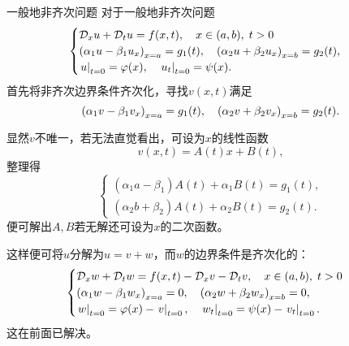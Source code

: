 \begin{method}{一般地非齐次问题}{}
	对于一般地非齐次问题
	\begin{align*}
		\begin{cases}
			\mathcal D_xu+\mathcal D_tu=f(x,t),\quad x\in(a,b),\;t>0\\
			\left(\alpha_1u-\beta_1u_x\right)_{x=a}=g_1(t),\quad\left(\alpha_2u+\beta_2u_x\right)_{x=b}=g_2(t),\\
			\left.u\right\rvert_{t=0}=\varphi(x),\quad\left.u_t\right\rvert_{t=0}=\psi(x).
		\end{cases}
	\end{align*}
	首先将非齐次边界条件齐次化，寻找$v(x,t)$满足 
	\[
		\left(\alpha_1v-\beta_1v_x\right)_{x=a}=g_1(t),\quad\left(\alpha_2v+\beta_2v_x\right)_{x=b}=g_2(t).
	\]
	
	显然$v$不唯一，若无法直觉看出，可设为$x$的线性函数
	\[
		v(x,t)=A(t)x+B(t),
	\]
	整理得
	\[
		\begin{cases}
			(\alpha_1a-\beta_1)A(t)+\alpha_1B(t)=g_1(t),\\
			(\alpha_2b+\beta_2)A(t)+\alpha_2B(t)=g_2(t).
		\end{cases}
	\]
	便可解出$A,B$若无解还可设为$x$的二次函数。
	
	这样便可将$u$分解为$u=v+w$，而$w$的边界条件是齐次化的：
	\begin{align*}
		\begin{cases}
			\mathcal D_xw+\mathcal D_tw=f(x,t)-\mathcal D_xv-\mathcal D_tv,\quad x\in(a,b),\;t>0\\
			\left(\alpha_1w-\beta_1w_x\right)_{x=a}=0,\quad\left(\alpha_2w+\beta_2w_x\right)_{x=b}=0,\\
			\left.w\right\rvert_{t=0}=\varphi(x)-\left.v\right\rvert_{t=0},\quad\left.w_t\right\rvert_{t=0}=\psi(x)-\left.v_t\right\rvert_{t=0}.
		\end{cases}
	\end{align*}
	这在前面已解决。
\end{method}

